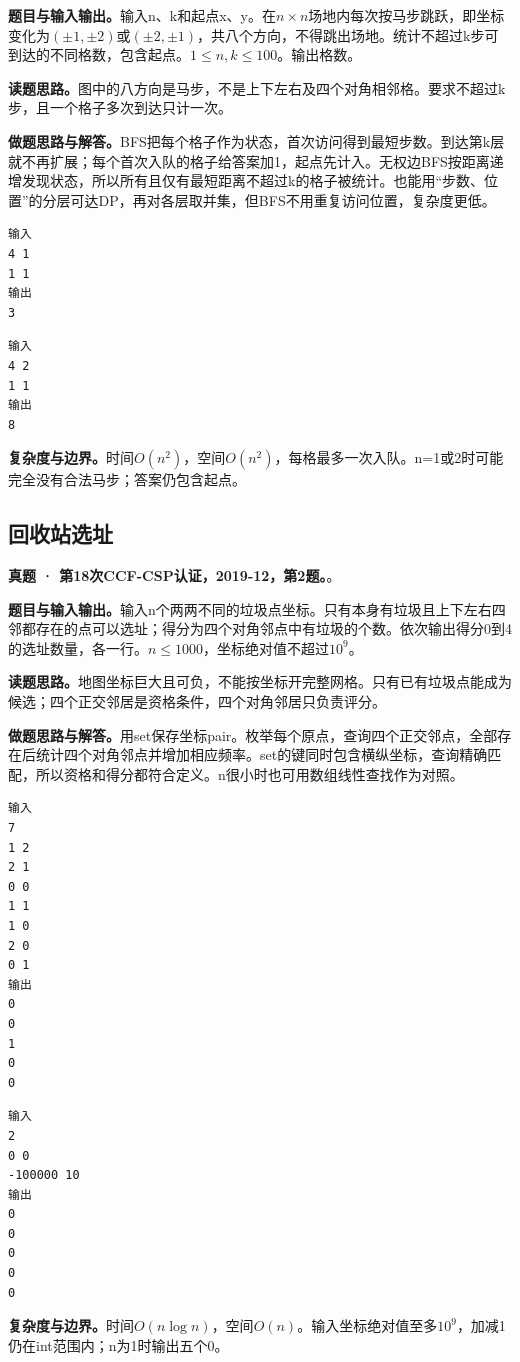 \noindent\textbf{题目与输入输出。}输入n、k和起点x、y。在$n\times n$场地内每次按马步跳跃，即坐标变化为$(\pm1,\pm2)$或$(\pm2,\pm1)$，共八个方向，不得跳出场地。统计不超过k步可到达的不同格数，包含起点。$1\le n,k\le100$。输出格数。

\noindent\textbf{读题思路。}图中的八方向是马步，不是上下左右及四个对角相邻格。要求不超过k步，且一个格子多次到达只计一次。

\noindent\textbf{做题思路与解答。}BFS把每个格子作为状态，首次访问得到最短步数。到达第k层就不再扩展；每个首次入队的格子给答案加1，起点先计入。无权边BFS按距离递增发现状态，所以所有且仅有最短距离不超过k的格子被统计。也能用“步数、位置”的分层可达DP，再对各层取并集，但BFS不用重复访问位置，复杂度更低。
\begin{verbatim}
输入
4 1
1 1
输出
3
\end{verbatim}
\begin{verbatim}
输入
4 2
1 1
输出
8
\end{verbatim}

\noindent\textbf{复杂度与边界。}时间$O(n^2)$，空间$O(n^2)$，每格最多一次入队。n=1或2时可能完全没有合法马步；答案仍包含起点。

\subsection{回收站选址}
\textbf{真题 · 第18次CCF-CSP认证，2019-12，第2题。}。

\noindent\textbf{题目与输入输出。}输入n个两两不同的垃圾点坐标。只有本身有垃圾且上下左右四邻都存在的点可以选址；得分为四个对角邻点中有垃圾的个数。依次输出得分0到4的选址数量，各一行。$n\le1000$，坐标绝对值不超过$10^9$。

\noindent\textbf{读题思路。}地图坐标巨大且可负，不能按坐标开完整网格。只有已有垃圾点能成为候选；四个正交邻居是资格条件，四个对角邻居只负责评分。

\noindent\textbf{做题思路与解答。}用set保存坐标pair。枚举每个原点，查询四个正交邻点，全部存在后统计四个对角邻点并增加相应频率。set的键同时包含横纵坐标，查询精确匹配，所以资格和得分都符合定义。n很小时也可用数组线性查找作为对照。
\begin{verbatim}
输入
7
1 2
2 1
0 0
1 1
1 0
2 0
0 1
输出
0
0
1
0
0
\end{verbatim}
\begin{verbatim}
输入
2
0 0
-100000 10
输出
0
0
0
0
0
\end{verbatim}

\noindent\textbf{复杂度与边界。}时间$O(n\log n)$，空间$O(n)$。输入坐标绝对值至多$10^9$，加减1仍在int范围内；n为1时输出五个0。
